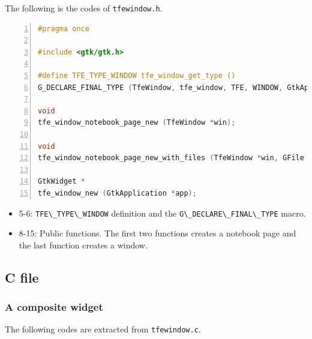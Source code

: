 The following is the codes of \passthrough{\lstinline!tfewindow.h!}.

\begin{lstlisting}[language=C, numbers=left]
#pragma once

#include <gtk/gtk.h>

#define TFE_TYPE_WINDOW tfe_window_get_type ()
G_DECLARE_FINAL_TYPE (TfeWindow, tfe_window, TFE, WINDOW, GtkApplicationWindow)

void
tfe_window_notebook_page_new (TfeWindow *win);

void
tfe_window_notebook_page_new_with_files (TfeWindow *win, GFile **files, int n_files);

GtkWidget *
tfe_window_new (GtkApplication *app);
\end{lstlisting}

\begin{itemize}
\tightlist
\item
  5-6: \passthrough{\lstinline!TFE\_TYPE\_WINDOW!} definition and the
  \passthrough{\lstinline!G\_DECLARE\_FINAL\_TYPE!} macro.
\item
  8-15: Public functions. The first two functions creates a notebook
  page and the last function creates a window.
\end{itemize}

\subsection{C file}\label{c-file}

\subsubsection{A composite widget}\label{a-composite-widget}

The following codes are extracted from
\passthrough{\lstinline!tfewindow.c!}.

